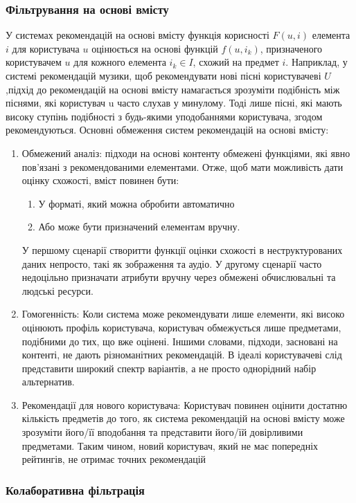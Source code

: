 \subsubsection{Фільтрування на основі вмісту}
У системах рекомендацій на основі вмісту функція корисності
$F(u,i)$ елемента $i$ для користувача $u$ оцінюється на основі
функцій $f(u,i_{k})$, призначеного користувачем $u$ для кожного
елемента $i_{k} \in I$, схожий на предмет $i$. Наприклад, у системі
рекомендацій музики, щоб рекомендувати нові пісні користувачеві
$U$,підхід до рекомендацій на основі вмісту намагається зрозуміти
подібність між піснями, які користувач u часто слухав у минулому.
Тоді лише пісні, які мають високу ступінь подібності з будь-якими
уподобаннями користувача, згодом рекомендуються.
Основні обмеження систем рекомендацій на основі вмісту:
\begin{enumerate}
    \item Обмежений аналіз: підходи на основі контенту обмежені функціями, які явно пов'язані з рекомендованими елементами. Отже, щоб мати можливість дати оцінку схожості, вміст повинен бути:
          \begin{enumerate}
              \item У форматі, який можна обробити автоматично
              \item Або може бути призначений елементам вручну.
          \end{enumerate}
          У першому сценарії створитти функції оцінки схожості в неструктурованих даних непросто, такі як зображення та аудіо. У другому сценарії часто недоцільно призначати атрибути вручну через обмежені обчислювальні та людські ресурси.
    \item Гомогенність: Коли система може рекомендувати лише елементи, які високо оцінюють профіль користувача, користувач обмежується лише предметами, подібними до тих, що вже оцінені. Іншими словами, підходи, засновані на контенті, не дають різноманітних рекомендацій. В ідеалі користувачеві слід представити широкий спектр варіантів, а не просто однорідний набір альтернатив.
    \item Рекомендації для нового користувача: Користувач повинен оцінити достатню кількість предметів до того, як система рекомендацій на основі вмісту може зрозуміти його/її вподобання та представити його/їй довірливими предметами. Таким чином, новий користувач, який не має попередніх рейтингів, не отримає точних рекомендацій
\end{enumerate}
\subsubsection{Колаборативна фільтрація}

